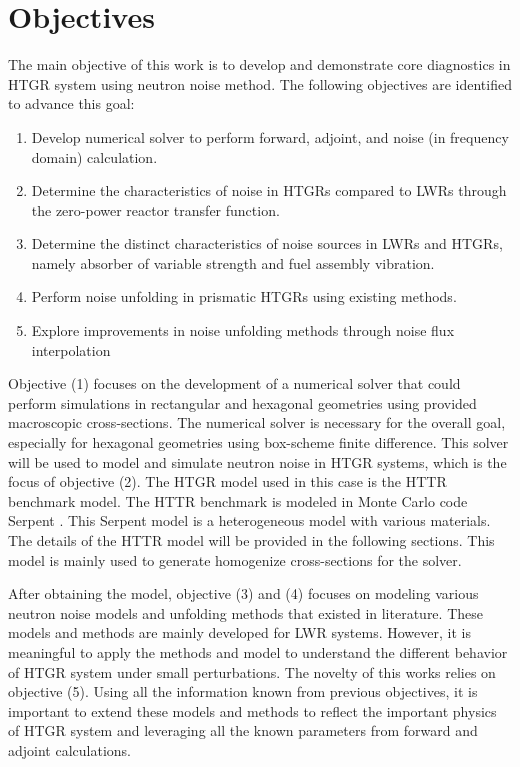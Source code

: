\section{Objectives}

The main objective of this work is to develop and demonstrate core diagnostics in HTGR system using neutron noise method. The following objectives are identified to advance this goal:
\begin{enumerate}
    \item Develop numerical solver to perform forward, adjoint, and noise (in frequency domain) calculation.
    \item Determine the characteristics of noise in HTGRs compared to LWRs through the zero-power reactor transfer function.
    \item Determine the distinct characteristics of noise sources in LWRs and HTGRs, namely absorber of variable strength and fuel assembly vibration.
    \item Perform noise unfolding in prismatic HTGRs using existing methods.
    \item Explore improvements in noise unfolding methods through noise flux interpolation
\end{enumerate}

Objective (1) focuses on the development of a numerical solver that could perform simulations in rectangular and hexagonal geometries using provided macroscopic cross-sections. The numerical solver is necessary for the overall goal, especially for hexagonal geometries using box-scheme finite difference. This solver will be used to model and simulate neutron noise in HTGR systems, which is the focus of objective (2). The HTGR model used in this case is the HTTR benchmark model. The HTTR benchmark is modeled in Monte Carlo code Serpent \cite{leppanenSerpentMonteCarlo2015}. This Serpent model is a heterogeneous model with various materials. The details of the HTTR model will be provided in the following sections. This model is mainly used to generate homogenize cross-sections for the solver. 

After obtaining the model, objective (3) and (4) focuses on modeling various neutron noise models and unfolding methods that existed in literature. These models and methods are mainly developed for LWR systems. However, it is meaningful to apply the methods and model to understand the different behavior of HTGR system under small perturbations. The novelty of this works relies on objective (5). Using all the information known from previous objectives, it is important to extend these models and methods to reflect the important physics of HTGR system and leveraging all the known parameters from forward and adjoint calculations.

